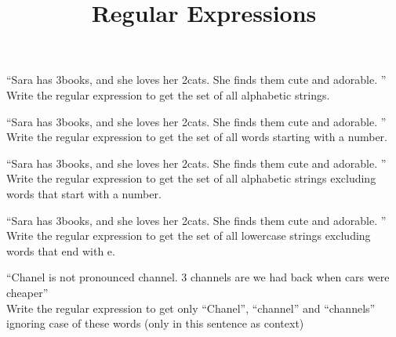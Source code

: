 \documentclass[theme=sleek, randomorder, hidesidemenu]{webquiz}
\title{Regular Expressions}
\begin{document}
\begin{question}
  ``Sara has 3books, and she loves her 2cats. She finds them cute and adorable. ''\\
  Write the regular expression to get the set of all alphabetic strings.
  \answer[string]{\[a-zA-Z\]+}
\end{question}

\begin{question}
  ``Sara has 3books, and she loves her 2cats. She finds them cute and adorable. ''\\
  Write the regular expression to get the set of all words starting with a number.
  \answer[string]{\[0-9\]\[a-zA-Z\]+}
\end{question}

\begin{question}
  ``Sara has 3books, and she loves her 2cats. She finds them cute and adorable. ''\\
  Write the regular expression to get the set of all alphabetic strings excluding words that start with a number.
\end{question}

\begin{question}
  ``Sara has 3books, and she loves her 2cats. She finds them cute and adorable. ''\\
  Write the regular expression to get the set of all lowercase strings excluding words that end with e.
\end{question}

\begin{question}
  ``Chanel is not pronounced channel. 3 channels are we had back when cars were cheaper''\\
  Write the regular expression to get only ``Chanel'', ``channel'' and ``channels'' ignoring case of these words (only in this sentence as context)


\end{question}
\end{document}
